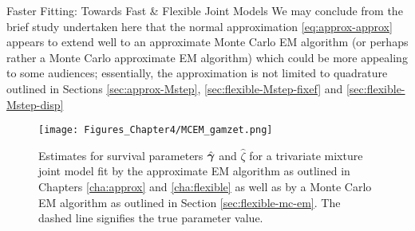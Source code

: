 \begin{chapter}{\label{cha:flexible}Faster Fitting: Towards Fast \& Flexible Joint Models}
We may conclude from the brief study undertaken here that the normal approximation \eqref{eq:approx-approx} appears to extend well to an approximate Monte Carlo EM algorithm (or perhaps rather a Monte Carlo approximate EM algorithm) which could be more appealing to some audiences; essentially, the approximation is not limited to quadrature outlined in Sections \ref{sec:approx-Mstep}, \ref{sec:flexible-Mstep-fixef} and \ref{sec:flexible-Mstep-disp}

\begin{figure}[ht]
    \centering
    \texttt{[image: Figures\_Chapter4/MCEM\_gamzet.png]}
    \caption{Estimates for survival parameters $\hat{\bm{\gamma}}$ and $\hat{\zeta}$ for a trivariate mixture joint model fit by the approximate EM algorithm as outlined in Chapters \ref{cha:approx} and \ref{cha:flexible} as well as by a Monte Carlo EM algorithm as outlined in Section \ref{sec:flexible-mc-em}. The dashed line signifies the true parameter value.}
    \label{fig:flexible-MCEM}
\end{figure}

\end{chapter}